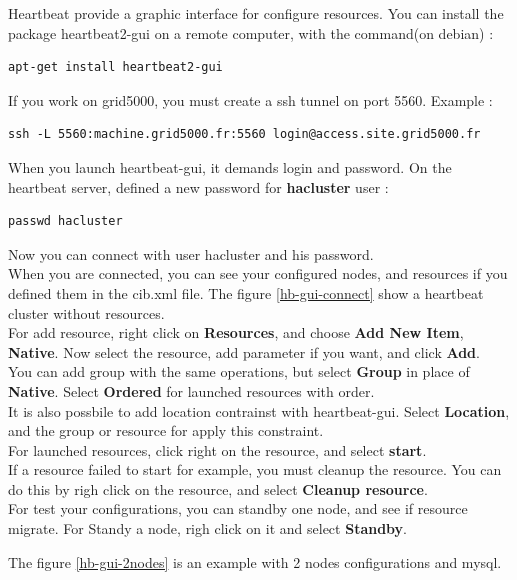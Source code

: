 \documentclass[a4paper,10pt]{report}
\begin{document}
Heartbeat provide a graphic interface for configure resources. You can install the package heartbeat2-gui on a remote computer, with the command(on debian) :
\begin{lstlisting}
apt-get install heartbeat2-gui
\end{lstlisting}
If you work on grid5000, you must create a ssh tunnel on port 5560. Example :
\begin{lstlisting}
ssh -L 5560:machine.grid5000.fr:5560 login@access.site.grid5000.fr
\end{lstlisting}
When you launch heartbeat-gui, it demands login and password. On the heartbeat server, defined a new password for \textbf{hacluster} user :
\begin{lstlisting}
passwd hacluster
\end{lstlisting}
Now you can connect with user hacluster and his password.\\

When you are connected, you can see your configured nodes, and resources if you defined them in the cib.xml file. The figure \ref{hb-gui-connect} show a heartbeat cluster without resources.\\

For add resource, right click on \textbf{Resources}, and choose \textbf{Add New Item}, \textbf{Native}. Now select the resource, add parameter if you want, and click \textbf{Add}.\\
You can add group with the same operations, but select \textbf{Group} in place of \textbf{Native}. Select \textbf{Ordered} for launched resources with order.\\

It is also possbile to add location contrainst with heartbeat-gui. Select \textbf{Location}, and the group or resource for apply this constraint.\\

For launched resources, click right on the resource, and select \textbf{start}.\\

If a resource failed to start for example, you must cleanup the resource. You can do this by righ click on the resource, and select \textbf{Cleanup resource}.\\

For test your configurations, you can standby one node, and see if resource migrate. For Standy a node, righ click on it and select \textbf{Standby}.

The figure \ref{hb-gui-2nodes} is an example with 2 nodes configurations and mysql.
\end{document}
